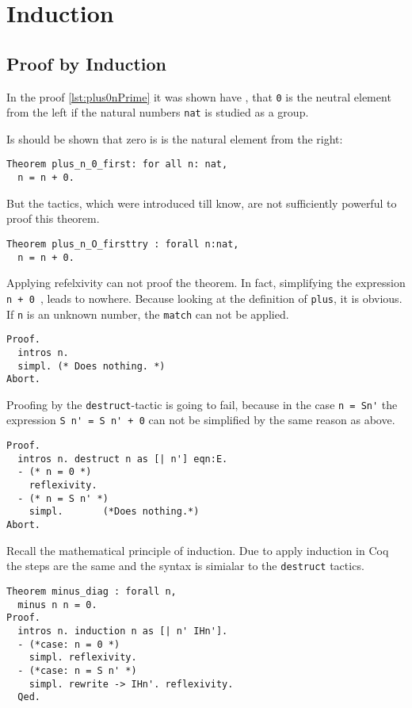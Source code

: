 \section{Induction}

\subsection{Proof by Induction}
In the proof \ref{lst:plus0nPrime} it was shown have , 
that \lstinline!0! is the neutral element from the left if the natural numbers \lstinline!nat! is studied as a group. 

Is should be shown that zero is is the natural element from the right:
\begin{lstlisting}
Theorem plus_n_0_first: for all n: nat,
  n = n + 0.  
\end{lstlisting}

But the tactics, which were introduced till know, are not sufficiently powerful to proof this theorem.

\begin{lstlisting}
Theorem plus_n_O_firsttry : forall n:nat,
  n = n + 0.
\end{lstlisting}

Applying refelxivity can not proof the theorem. In fact, simplifying the expression \lstinline!n + 0 !, leads to nowhere.
Because looking at the definition of \lstinline!plus!, it is obvious.
If \lstinline!n! is an unknown number, the  \lstinline!match! can not be applied.
  
\begin{lstlisting}
Proof.
  intros n.
  simpl. (* Does nothing. *)
Abort.
\end{lstlisting}

Proofing by the \lstinline!destruct!-tactic is going to fail, because in the case \lstinline!n = Sn'! the expression \lstinline!S n' = S n' + 0! can not be simplified by the same reason as above.
\begin{lstlisting}
Proof.
  intros n. destruct n as [| n'] eqn:E.
  - (* n = 0 *)
    reflexivity. 
  - (* n = S n' *)
    simpl.       (*Does nothing.*)
Abort.
\end{lstlisting}

Recall the mathematical principle of induction.
Due to apply induction in Coq the steps are the same and the syntax is simialar to the \lstinline!destruct! tactics.
 

\begin{lstlisting}
Theorem minus_diag : forall n,
  minus n n = 0.
Proof.
  intros n. induction n as [| n' IHn'].
  - (*case: n = 0 *)
    simpl. reflexivity.
  - (*case: n = S n' *)
    simpl. rewrite -> IHn'. reflexivity.  
  Qed.
\end{lstlisting}


